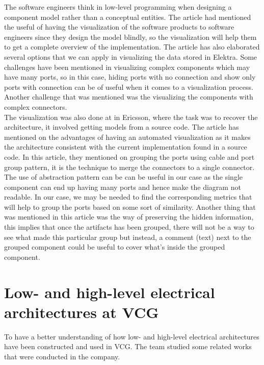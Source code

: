 The software engineers think in low-level programming when designing a component model rather than a conceptual entities. The article had mentioned the useful of having the visualization of the software products to software engineers since they design the model blindly, so the visualization will help them to get a complete overview of the implementation. The article has also elaborated several options that we can apply in visualizing the data stored in Elektra. Some challenges have been mentioned in visualizing complex components which may have many ports, so in this case, hiding ports with no connection and show only ports with connection can be of useful when it comes to a visualization process. Another challenge that was mentioned was the visualizing the components with complex connectors.\\

The visualization was also done at in Ericsson, where the task was to recover the architecture, it involved getting models from a source code\cite{Adam}. The article has mentioned on the advantages of having an automated visualization as it makes the architecture consistent with the current implementation found in a source code. In this article, they mentioned on grouping the ports using cable and port group pattern, it is the technique to merge the connectors to a single connector. The use of abstraction pattern can be can be useful in our case as the single component can end up having many ports and hence make the diagram not readable. In our case, we may be needed to find the corresponding metrics that will help to group the ports based on some sort of similarity. Another thing that was mentioned in this article was the way of preserving the hidden information, this implies that once the artifacts has been grouped, there will not be a way to see what made this particular group but instead, a comment (text) next to the grouped component could be useful to cover what's inside the grouped component.


\section{Low- and high-level electrical architectures at VCG}
To have a better understanding of how low- and high-level electrical architectures have been constructed and used in VCG. The team studied some related works that were conducted in the company.\\

